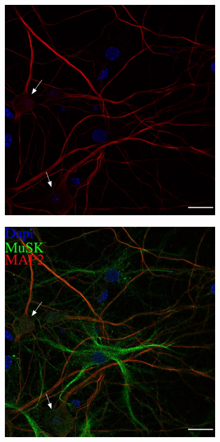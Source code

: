 \begin{figure}
\begin{subfigure}[h]{0.329\textwidth}
		\end{subfigure}
		\begin{subfigure}[h]{0.329\textwidth}
			\caption{}
			\label{fig:CultureMMmap2}
			\includegraphics[width=\textwidth]{./Images/Immuno/Musk/Cultures/MAP2_20um.jpg}
		\end{subfigure}
		\begin{subfigure}[h]{0.329\textwidth}
			\caption{}
			\label{fig:CultureMMmap2musk}
			\includegraphics[width=\textwidth]{./Images/Immuno/Musk/Cultures/MuSK-MAP2_20um.jpg}

\end{subfigure}
\end{figure}

